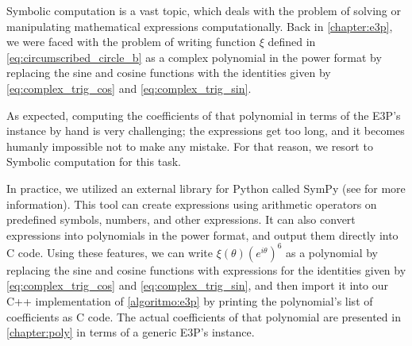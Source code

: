 Symbolic computation is a vast topic, which deals with the problem of solving or manipulating mathematical expressions computationally. 
Back in \autoref{chapter:e3p}, we were faced with the problem of writing function $\xi$ defined in \autoref{eq:circumscribed_circle_b} as a complex polynomial in the power format by replacing the sine and cosine functions with the identities given by  \autoref{eq:complex_trig_cos} and \autoref{eq:complex_trig_sin}.

As expected, computing the coefficients of that polynomial in terms of the E3P's instance by hand is very challenging; the expressions get too long, and it becomes humanly impossible not to make any mistake. 
For that reason, we resort to Symbolic computation for this task.

In practice, we utilized an external library for Python called SymPy (see  for more information).
This tool can create expressions using arithmetic operators on predefined symbols, numbers, and other expressions. It can also convert expressions into polynomials in the power format, and output them directly into C code. Using these features, we can write $\xi(\theta)(e^{i\theta})^6$ as a polynomial by replacing the sine and cosine functions with expressions for the identities given by  \autoref{eq:complex_trig_cos} and \autoref{eq:complex_trig_sin}, and then import it into our C++ implementation of \autoref{algoritmo:e3p} by printing the polynomial's list of coefficients as C code.
The actual coefficients of that polynomial are presented in \autoref{chapter:poly} in terms of a generic E3P's instance.







